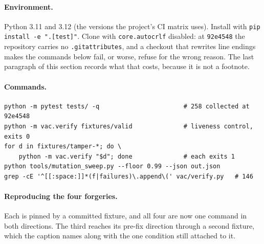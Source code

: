 \documentclass[11pt]{article}
\begin{document}
\paragraph{Environment.} Python 3.11 and 3.12 (the versions the project's CI matrix uses).
Install with \texttt{pip install -e ".[test]"}. Clone with \texttt{core.autocrlf} disabled: at
\texttt{92e4548} the repository carries no \texttt{.gitattributes}, and a checkout that rewrites
line endings makes the commands below fail, or worse, refuse for the wrong reason. The last
paragraph of this section records what that costs, because it is not a footnote.

\paragraph{Commands.}
\begin{Verbatim}[frame=single,fontsize=\small]
python -m pytest tests/ -q                       # 258 collected at 92e4548
python -m vac.verify fixtures/valid              # liveness control, exits 0
for d in fixtures/tamper-*; do \
    python -m vac.verify "$d"; done              # each exits 1
python tools/mutation_sweep.py --floor 0.99 --json out.json
grep -cE '^[[:space:]]*(f|failures)\.append\(' vac/verify.py   # 146
\end{Verbatim}

\paragraph{Reproducing the four forgeries.} Each is pinned by a committed fixture, and all
four are now one command in both directions. The third reaches its pre-fix direction through a
second fixture, which the caption names along with the one condition still attached to it.
\end{document}
